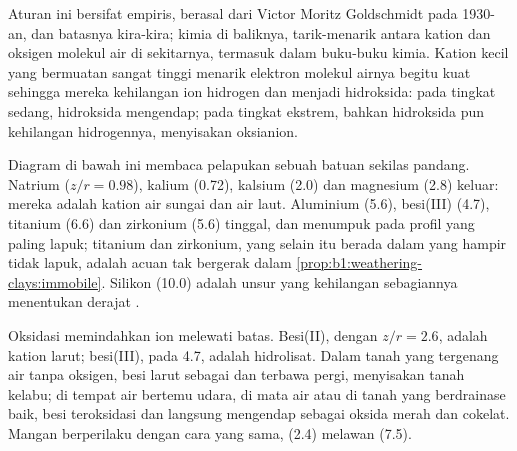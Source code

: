 Aturan ini bersifat empiris, berasal dari Victor Moritz Goldschmidt pada 1930-an, dan batasnya kira-kira; kimia di baliknya, tarik-menarik antara kation dan oksigen molekul air di sekitarnya, termasuk dalam buku-buku kimia. Kation kecil yang bermuatan sangat tinggi menarik elektron molekul airnya begitu kuat sehingga mereka kehilangan ion hidrogen dan menjadi hidroksida: pada tingkat sedang, hidroksida mengendap; pada tingkat ekstrem, bahkan hidroksida pun kehilangan hidrogennya, menyisakan oksianion.

Diagram di bawah ini membaca pelapukan sebuah batuan sekilas pandang. Natrium ($z/r = 0.98$), kalium (0.72), kalsium (2.0) dan magnesium (2.8) keluar: mereka adalah kation air sungai dan air laut. Aluminium (5.6), besi(III) (4.7), titanium (6.6) dan zirkonium (5.6) tinggal, dan menumpuk pada profil yang paling lapuk; titanium dan zirkonium, yang selain itu berada dalam  yang hampir tidak lapuk, adalah acuan tak bergerak dalam \cref{prop:b1:weathering-clays:immobile}. Silikon (10.0) adalah unsur yang kehilangan sebagiannya menentukan derajat .

Oksidasi memindahkan ion melewati batas. Besi(II), dengan $z/r = 2.6$, adalah kation larut; besi(III), pada 4.7, adalah hidrolisat. Dalam tanah yang tergenang air tanpa oksigen, besi larut sebagai  dan terbawa pergi, menyisakan tanah kelabu; di tempat air bertemu udara, di mata air atau di tanah yang berdrainase baik, besi teroksidasi dan langsung mengendap sebagai oksida merah dan cokelat. Mangan berperilaku dengan cara yang sama,  (2.4) melawan  (7.5).

